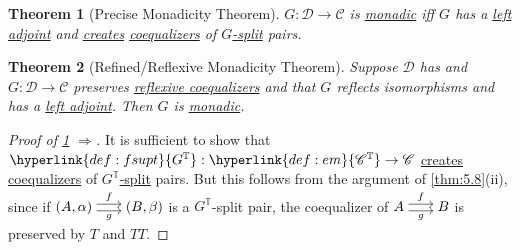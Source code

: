 \documentclass{article}
\newenvironment{tikzcdi}{\begin{tikzcd}[cramped, sep=scriptsize]}{\end{tikzcd}}
\newtheorem{nthm}{Theorem}[section]
\begin{document}
\begin{nthm}[Precise Monadicity Theorem]\label{thm:5.12}
  $G: \mathscr{D} \to \mathscr{C}$ is \hyperlink{def:monadic}{monadic} iff $G$ has a \hyperlink{def:adj}{left adjoint} and \hyperlink{def:clim}{creates} \hyperlink{def:equalizer}{coequalizers} of \hyperlink{def:gsplit}{$G$-split} pairs.
\end{nthm}
\begin{nthm}[Refined/Reflexive Monadicity Theorem]\label{thm:5.13}
  Suppose $\mathscr{D}$ has and $G: \mathscr{D} \to \mathscr{C}$ preserves \hyperlink{def:reflexive}{reflexive coequalizers} and that $G$ reflects isomorphisms and has a \hyperlink{def:adj}{left adjoint}. Then $G$ is \hyperlink{def:monadic}{monadic}.
\end{nthm}
\begin{proof}[Proof of \cref{thm:5.12} $\Rightarrow$]
  It is sufficient to show that $\hyperlink{def:fsupt}{G^\mathbb{T}}: \hyperlink{def:em}{\mathscr{C}^\mathbb{T}}\to\mathscr{C}$ \hyperlink{def:clim}{creates} \hyperlink{def:equalizer}{coequalizers} of \hyperlink{def:gsplit}{$G^\mathbb{T}$-split} pairs.
   But this follows from the argument of \cref{thm:5.8}(ii), since if $\begin{tikzcdi}(A,\alpha) \rar[shift left]{f} \rar[shift right,']{g} & (B, \beta)\end{tikzcdi}$ is a $G^\mathbb{T}$-split pair, the coequalizer of $\begin{tikzcdi}A \rar[shift left]{f} \rar[shift right,']{g} & B\end{tikzcdi}$ is preserved by $T$ and $TT$.
\end{proof}
\end{document}

